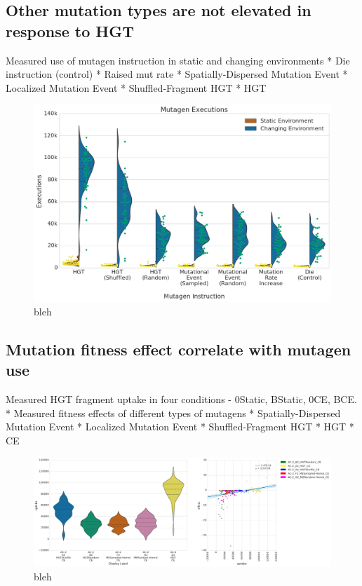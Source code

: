 \documentclass[PhD]{msu-thesis}
\begin{document}
\subsection{Other mutation types are not elevated in response to HGT}
Measured use of mutagen instruction in static and changing environments
* Die instruction (control)
* Raised mut rate
* Spatially-Dispersed Mutation Event
* Localized Mutation Event
* Shuffled-Fragment HGT 
* HGT


\begin{figure}[h!]
\begin{center}
\includegraphics[width=0.7\columnwidth]{figures/HGT/mutagen_execution.png}
\caption{bleh
}\label{fig:mutagen_execution}
\end{center}
\end{figure}

\subsection{Mutation fitness effect correlate with mutagen use}
Measured HGT fragment uptake in four conditions - 0Static, BStatic, 0CE, BCE.
* Measured fitness effects of different types of mutagens
  * Spatially-Dispersed Mutation Event
  * Localized Mutation Event
  * Shuffled-Fragment HGT
  * HGT
  * CE

\begin{figure}[h!]
\begin{center}
\includegraphics[width=0.7\columnwidth]{figures/HGT/mutagen_use_vs_fitness_effect.png}
\caption{bleh
}\label{fig:mutagen_use_vs_fitness_effect}
\end{center}
\end{figure}
\end{document}
